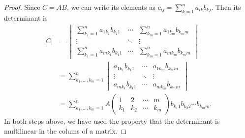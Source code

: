 \documentclass[12pt]{article}
\begin{document}
\begin{proof}

Since $C=AB$, we can write its elements as $c_{ij} = \sum_{k=1}^n
a_{ik} b_{kj}$. Then its determinant is
\begin{align*}
  |C| &= \begin{vmatrix}
      \sum_{k_1=1}^n a_{1 k_1} b_{k_1 1} & \cdots &
        \sum_{k_m=1}^n a_{1 k_m} b_{k_m m} \\
      \vdots & \ddots & \vdots \\
      \sum_{k_1=1}^n a_{m k_1} b_{k_1 1} & \cdots &
        \sum_{k_m=1}^n a_{m k_m} b_{k_m m}
    \end{vmatrix} \\
  &= \sum_{k_1,\ldots,k_m=1}^n \begin{vmatrix}
      a_{1 k_1} b_{k_1 1} & \cdots & a_{1k_m} b_{k_m m} \\
      \vdots & \ddots & \vdots \\
      a_{m k_1} b_{k_1 1} & \cdots & a_{mk_m} b_{k_m m}
    \end{vmatrix} \\
   &= \sum_{k_1,\ldots,k_m=1}^n
     A \begin{pmatrix} 1 & 2 & \cdots & m \\ k_1 & k_2 & \cdots
       & k_m \end{pmatrix} b_{k_1 1} b_{k_2 2} \cdots b_{k_m m}.
\end{align*}
In both steps above, we have used the property that the determinant is
multilinear in the colums of a matrix.


\end{proof}
\end{document}
